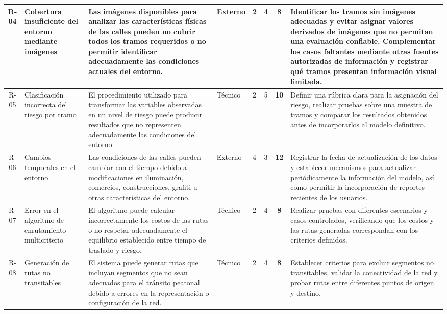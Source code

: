 \begin{landscape}
\begin{longtable}{|c|p{3cm}|p{5cm}|p{2cm}|p{1.1cm}|c|c|p{6cm}|}
R-04 & Cobertura insuficiente del entorno mediante imágenes & Las imágenes disponibles para analizar las características físicas de las calles pueden no cubrir todos los tramos requeridos o no permitir identificar adecuadamente las condiciones actuales del entorno. & Externo & 2 & 4 & \cellcolor{riskYellow} \textbf{8} & Identificar los tramos sin imágenes adecuadas y evitar asignar valores derivados de imágenes que no permitan una evaluación confiable. Complementar los casos faltantes mediante otras fuentes autorizadas de información y registrar qué tramos presentan información visual limitada. \\ \hline

R-05 & Clasificación incorrecta del riesgo por tramo & El procedimiento utilizado para transformar las variables observadas en un nivel de riesgo puede producir resultados que no representen adecuadamente las condiciones del entorno. & Técnico & 2 & 5 & \cellcolor{riskOrange} \textbf{10} & Definir una rúbrica clara para la asignación del riesgo, realizar pruebas sobre una muestra de tramos y comparar los resultados obtenidos antes de incorporarlos al modelo definitivo. \\ \hline

R-06 & Cambios temporales en el entorno & Las condiciones de las calles pueden cambiar con el tiempo debido a modificaciones en iluminación, comercios, construcciones, grafiti u otras características del entorno. & Externo & 4 & 3 & \cellcolor{riskOrange} \textbf{12} & Registrar la fecha de actualización de los datos y establecer mecanismos para actualizar periódicamente la información del modelo, así como permitir la incorporación de reportes recientes de los usuarios. \\ \hline

R-07 & Error en el algoritmo de enrutamiento multicriterio & El algoritmo puede calcular incorrectamente los costos de las rutas o no respetar adecuadamente el equilibrio establecido entre tiempo de traslado y riesgo. & Técnico & 2 & 4 & \cellcolor{riskYellow} \textbf{8} & Realizar pruebas con diferentes escenarios y casos controlados, verificando que los costos y las rutas generadas correspondan con los criterios definidos. \\ \hline

R-08 & Generación de rutas no transitables & El sistema puede generar rutas que incluyan segmentos que no sean adecuados para el tránsito peatonal debido a errores en la representación o configuración de la red. & Técnico & 2 & 4 & \cellcolor{riskYellow} \textbf{8} & Establecer criterios para excluir segmentos no transitables, validar la conectividad de la red y probar rutas entre diferentes puntos de origen y destino. \\ \hline


\end{longtable}
\end{landscape}
